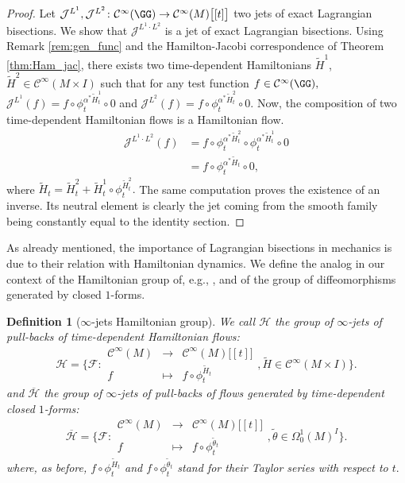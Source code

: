 \documentclass[a4paper,11pt]{article}
\newcommand{\func}[1]{\mathcal{C}^{\infty}(#1)}
\newtheorem{definition}[theorem]{Definition}
\begin{document}
\begin{proof}
Let $\mathcal{J}^{L^1}, \mathcal{J}^{L^2} \colon \func{\GG} \to \func{M}\bigl[ [t] \bigr]$ two jets of exact Lagrangian bisections. We show that $\mathcal{J}^{L^1 \cdot L^2}$ is a jet of exact Lagrangian bisections. Using Remark \ref{rem:gen_func} and the Hamilton-Jacobi correspondence of Theorem \ref{thm:Ham_jac}, there exists two time-dependent Hamiltonians $\tilde{H}^1$, $\tilde{H}^2 \in \func{M \times I}$ such that for any test function $f \in \func{\GG},$ $\mathcal{J}^{L^1}(f) = f \circ \phi_t^{\alpha^* \tilde{H}_t^1} \circ 0$ and $\mathcal{J}^{L^2}(f) = f \circ \phi_t^{\alpha^* \tilde{H}_t^2} \circ 0.$ Now, the composition of two time-dependent Hamiltonian flows is a Hamiltonian flow. 
\begin{align*}
\mathcal{J}^{L^1 \cdot L^2}(f) &= f \circ \phi_t^{\alpha^* \tilde{H}_t^2} \circ \phi_t^{\alpha^* \tilde{H}_t^1} \circ 0\\
			       &= f \circ \phi_t^{\alpha^* \tilde{H}_t} \circ 0,
\end{align*}
where $\tilde{H}_t = \tilde{H}_t^2 + \tilde{H}_t^1 \circ \phi_t^{\tilde{H}_t^2}.$ The same computation proves the existence of an inverse. Its neutral element is clearly the jet coming from the smooth family being constantly equal to the identity section.
\end{proof}

As already mentioned, the importance of Lagrangian bisections in mechanics is due to their relation with Hamiltonian dynamics. We define the analog in our context of the Hamiltonian group of, e.g., \cite[Def. 1.11.]{Crainic2021}, and of the group of diffeomorphisms generated by closed $1$-forms.

\begin{definition}[$\infty$-jets Hamiltonian group]
We call $\mathcal{H}$ the group of $\infty$-jets of pull-backs of time-dependent Hamiltonian flows:
\[
\mathcal{H} = \bigl\{ \mathcal{F} \colon 
\begin{array}{ccc}
\func{M} & \to & \func{M}\bigl[[t]\bigr]\\
f & \mapsto & f \circ \phi^{\tilde{H}_t}_t
\end{array}, \tilde{H} \in \func{M \times I} \bigr\}. 
\]
and $\overline{\mathcal{H}}$ the group of $\infty$-jets of pull-backs of flows generated by time-dependent closed $1$-forms:
\[
\overline{\mathcal{H}} = \bigl\{ \mathcal{F} \colon 
\begin{array}{ccc}
\func{M} & \to & \func{M}\bigl[[t]\bigr]\\
f & \mapsto & f \circ \phi^{\tilde{\theta}_t}_t
\end{array}, \tilde{\theta} \in \Omega_0^1(M)^I \bigr\}. 
\]
where, as before, $f \circ \phi^{\tilde{H}_t}_t$ and $f \circ \phi^{\tilde{\theta}_t}_t$ stand for their Taylor series with respect to $t.$
\end{definition}
\end{document}
